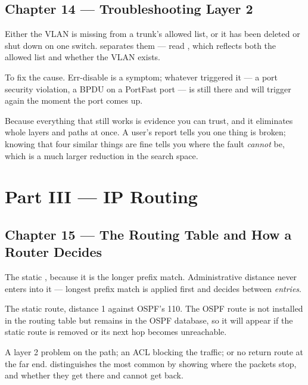 \subsection*{Chapter 14 --- Troubleshooting Layer 2}
\begin{tightnum}
  \item Either the VLAN is missing from a trunk's allowed list, or it has been
        deleted or shut down on one switch.  separates
        them --- read , which reflects both the
        allowed list and whether the VLAN exists.
  \item To fix the cause. Err-disable is a symptom; whatever triggered it --- a
        port security violation, a BPDU on a PortFast port --- is still there and
        will trigger again the moment the port comes up.
  \item Because everything that still works is evidence you can trust, and it
        eliminates whole layers and paths at once. A user's report tells you one
        thing is broken; knowing that four similar things are fine tells you
        where the fault \emph{cannot} be, which is a much larger reduction in the
        search space.
\end{tightnum}

\section*{Part III --- IP Routing}

\subsection*{Chapter 15 --- The Routing Table and How a Router Decides}
\begin{tightnum}
  \item The static , because it is the longer prefix match.
        Administrative distance never enters into it --- longest prefix match is
        applied first and decides between \emph{entries}.
  \item The static route, distance 1 against OSPF's 110. The OSPF route is not
        installed in the routing table but remains in the OSPF database, so it
        will appear if the static route is removed or its next hop becomes
        unreachable.
  \item A layer 2 problem on the path; an ACL blocking the traffic; or no return
        route at the far end.  distinguishes the most common by
        showing where the packets stop, and whether they get there and cannot get
        back.
\end{tightnum}

